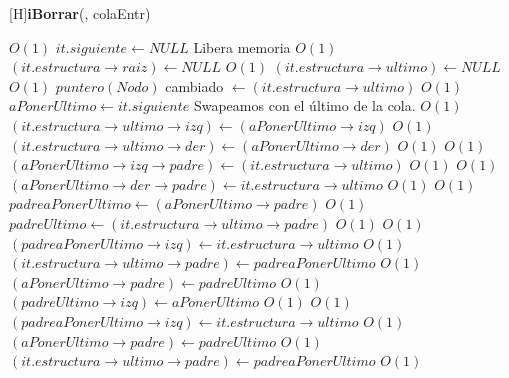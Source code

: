 \begin{Algoritmos}


[H]{\textbf{iBorrar}(, colaEntr)}
    	\begin{algorithmic}[1]
    		 \Comment $O(1)$
    			\State $it.siguiente \gets NULL$ \Comment Libera memoria $O(1)$
    			\State $(it.estructura \rightarrow raiz) \gets NULL$ \Comment $O(1)$
    			\State $(it.estructura \rightarrow ultimo) \gets NULL$ \Comment $O(1)$
    		\Else    		
    			\State $puntero(Nodo)$ cambiado $\gets (it.estructura \rightarrow ultimo)$ \Comment $O(1)$
    			\State $aPonerUltimo \gets it.siguiente$
				 \Comment Swapeamos con el \'ultimo de la cola. $O(1)$	
					\State $(it.estructura \rightarrow ultimo \rightarrow izq) \gets (aPonerUltimo \rightarrow izq)$ \Comment $O(1)$
			\State $(it.estructura \rightarrow ultimo \rightarrow der) \gets (aPonerUltimo \rightarrow der)$ \Comment $O(1)$	
			 \Comment $O(1)$
				\State $(aPonerUltimo \rightarrow izq \rightarrow padre) \gets (it.estructura \rightarrow ultimo)$ \Comment $O(1)$
			\EndIf	
			 \Comment $O(1)$
				\State $(aPonerUltimo \rightarrow der \rightarrow padre) \gets it.estructura \rightarrow ultimo$ \Comment $O(1)$
			\EndIf		
			 \Comment $O(1)$
				\State $padreaPonerUltimo \gets (aPonerUltimo \rightarrow padre)$ \Comment $O(1)$
				\State $padreUltimo \gets (it.estructura \rightarrow ultimo \rightarrow padre)$			 	 \Comment $O(1)$
			 	 \Comment $O(1)$
			 	\State $(padreaPonerUltimo \rightarrow izq) \gets it.estructura \rightarrow ultimo$ \Comment $O(1)$
			 	\State $(it.estructura \rightarrow ultimo \rightarrow padre) \gets padreaPonerUltimo$ \Comment $O(1)$
			 	\State $(aPonerUltimo \rightarrow padre) \gets padreUltimo$ \Comment $O(1)$
			 	\State $(padreUltimo \rightarrow izq) \gets aPonerUltimo$ \Comment $O(1)$
			 	\Else
			 		 \Comment $O(1)$
			 		\State $(padreaPonerUltimo \rightarrow izq) \gets it.estructura \rightarrow ultimo$ \Comment $O(1)$
			 		\State $(aPonerUltimo \rightarrow padre) \gets padreUltimo$ \Comment $O(1)$
			 		\State $(it.estructura \rightarrow ultimo \rightarrow padre) \gets padreaPonerUltimo$ \Comment $O(1)$

\end{algorithmic}
\end{Algoritmos}
